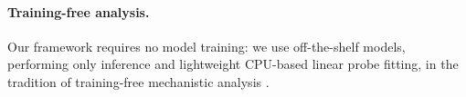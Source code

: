\paragraph{Training-free analysis.}
Our framework requires no model training: we use off-the-shelf models, performing only inference and lightweight CPU-based linear probe fitting, in the tradition of training-free mechanistic analysis \cite{hewitt-manning-2019-structural, belinkov-2022-probing}.
